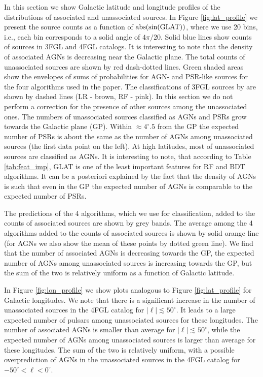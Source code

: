 In this section we show Galactic latitude and longitude profiles of the distributions of associated and unassociated sources.
In Figure \ref{fig:lat_profile} we present the source counts as a function of ${\rm abs(sin(GLAT))}$,
where we use 20 bins, i.e., each bin corresponds to a solid angle of $4 \pi / 20$. 
Solid blue lines show counts of sources in 3FGL and 4FGL catalogs.
It is interesting to note that the density of associated AGNs is decreasing near the Galactic plane.
The total counts of unassociated sources are shown by red dash-dotted lines.
Green shaded areas show the envelopes of sums of probabilities for AGN- and PSR-like sources for the four algorithms used in the paper.
The classifications of 3FGL sources by \cite{2016ApJ...820....8S} are shown by dashed lines (LR - brown, RF - pink).
In this section we do not perform a correction for the presence of other sources among the unassociated ones.
The numbers of unassociated sources classified as AGNs and PSRs grow towards the Galactic plane (GP).
Within $\approx 4^\circ.5$ from the GP the expected number of PSRs is about the same as the number of AGNs among unassociated sources (the first data point on the left).
At high latitudes, most of unassociated sources are classified as AGNs.
It is interesting to note, that according to Table \ref{tab:feat_imp}, GLAT is one of the least important features for RF and BDT algorithms.
It can be a posteriori explained by the fact that
 the density of AGNs is such that even in the GP the expected number of AGNs is comparable to the expected number of PSRs.

The predictions of the 4 algorithms, which we use for classification, added to the counts of associated sources are shown by grey bands.
The average among the 4 algorithms added to the counts of associated sources is shown by solid orange line 
(for AGNs we also show the mean of these points by dotted green line).
We find that the number of associated AGNs is decreasing towards the GP, the expected number of AGNs among unassociated sources is increasing towards the GP, but the sum of the two is relatively uniform as a function of Galactic latitude.

In Figure \ref{fig:lon_profile} we show plots analogous to Figure \ref{fig:lat_profile} for Galactic longitudes.
We note that there is a significant increase in the number of unassociated sources in the 4FGL catalog for $|\ell | \lesssim 50^\circ$.
It leads to a large expected number of pulsars among unassociated sources for these longitudes.
The number of associated AGNs is smaller than average for $|\ell | \lesssim 50^\circ$, while the expected number of AGNs among unassociated sources is larger than average for these longitudes.
The sum of the two is relatively uniform, with a possible overprediction of AGNs in the unassociated sources in the 4FGL catalog for $-50^\circ < \ell < 0^\circ$.










